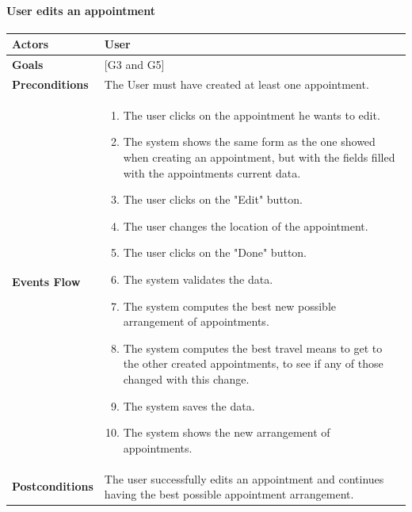 \documentclass[12pt]{article}
\begin{document}
\newpage

\paragraph{User edits an appointment}

\begin{center}
    \begin{tabular} { |p{}|p{}| }
        \hline
        \textbf{Actors} & User \\ 
        \hline
        \textbf{Goals} & {[G3 and G5]} \\ 
        \hline  
        \textbf{Preconditions} & The User must have created at least one appointment. \\ 
        \hline
        \textbf{Events Flow} & \begin{enumerate}[topsep=0pt] 
                            \setlength{\itemsep}{0.5pt}
                            \item The user clicks on the appointment he wants to edit.
                            \item The system shows the same form as the one showed when creating an appointment, but with the fields filled with the appointments current data.
                            \item The user clicks on the "Edit" button.
                            \item The user changes the location of the appointment.
                            \item The user clicks on the "Done" button.
                            \item The system validates the data.
                            \item The system computes the best new possible arrangement of appointments.
                            \item The system computes the best travel means to get to the other created appointments, to see if any of those changed with this change.
                            \item The system saves the data.
                            \item The system shows the new arrangement of appointments.
                            \end{enumerate} \\
        \hline
        \textbf{Postconditions} & The user successfully edits an appointment and continues having the best possible appointment arrangement. \\

\end{tabular}
\end{center}
\end{document}
